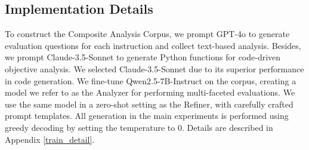 \begin{table}[ht!]
\center
{}
\caption{Evaluation accuracy on test subsets of LLMBar series. The highest average accuracy is marked by \textbf{bold}.}
\label{llmbar_result}
\end{table}

\subsection{Implementation Details}
To construct the Composite Analysis Corpus, we prompt GPT-4o to generate evaluation questions for each instruction and collect text-based analysis. Besides, we prompt Claude-3.5-Sonnet to generate Python functions for code-driven objective analysis. We selected Claude-3.5-Sonnet due to its superior performance in code generation. 
We fine-tune Qwen2.5-7B-Instruct \cite{qwen25} on the corpus, creating a model we refer to as the Analyzer for performing multi-faceted evaluations. We use the same model in a zero-shot setting as the Refiner, with carefully crafted prompt templates. All generation in the main experiments is performed using greedy decoding by setting the temperature to 0. Details are described in Appendix \ref{train_detail}.


